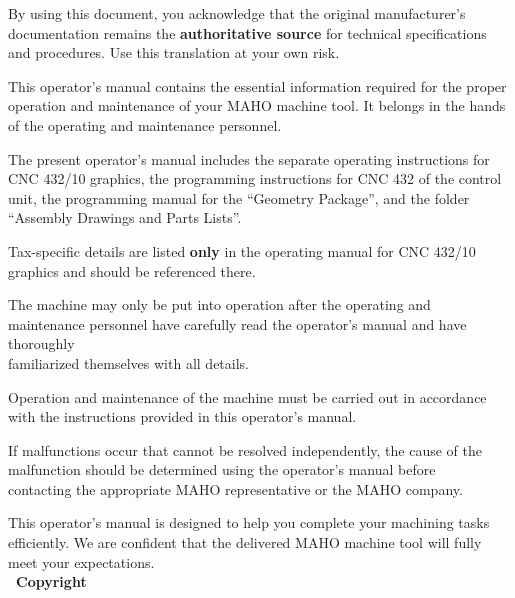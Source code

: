 By using this document, you acknowledge that the original manufacturer's documentation remains the \textbf{authoritative source} for technical specifications and procedures. Use this translation at your own risk.

\clearpage %

\pagestyle{fancy} %

\setcounter{chapter}{0}
\setcounter{section}{0}

This operator's manual contains the essential information required for the proper operation and maintenance of your MAHO machine tool. It belongs in the hands of the operating and maintenance personnel.

The present operator's manual includes the separate operating instructions for CNC 432/10 graphics, the programming instructions for CNC 432 of the control unit, the programming manual for the \enquote{Geometry Package}, and the folder \enquote{Assembly Drawings and Parts Lists}.

Tax-specific details are listed \textbf{only} in the operating manual for CNC 432/10 graphics and should be referenced there.

The machine may only be put into operation after the operating and maintenance personnel have carefully read the operator's manual and have thoroughly\\ familiarized themselves with all details.

Operation and maintenance of the machine must be carried out in accordance with the instructions provided in this operator's manual.


If malfunctions occur that cannot be resolved independently, the cause of the malfunction should be determined using the operator's manual before \\contacting the appropriate MAHO representative or the MAHO company.

This operator's manual is designed to help you complete your machining tasks efficiently. We are confident that the delivered MAHO machine tool will fully meet your expectations. \\[1cm]

\noindent
\textbf{\textcopyright\ Copyright} \\[0.2cm]

